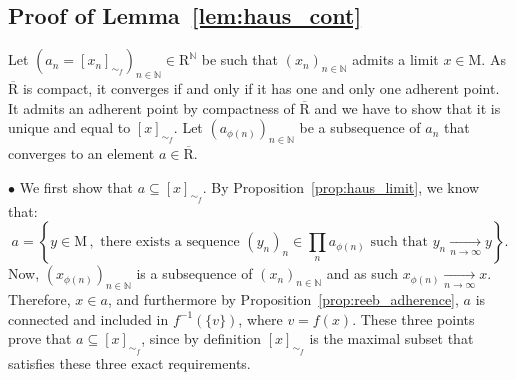 \documentclass[pdflatex,sn-mathphys-ay]{sn-jnl}%
\newcommand{\reeb}{\mathrm{R}}
\newcommand{\man}{\mathrm{M}}
\newcommand{\converge}{\underset{n\rightarrow\infty}{\longrightarrow}}
\newcommand{\N}{\mathbb{N}}
\newcommand{\preim}[2]{#1^{-1}(#2)}
\theoremstyle{thmstyleone}%
\begin{document}
\begin{appendices}
\subsection{Proof of Lemma~\ref{lem:haus_cont}}

Let $(a_n=[x_n]_{\sim_f})_{n\in\N} \in \reeb^{\N}$ be such that $(x_n)_{n\in\N}$ admits a limit $x \in \man$. As $\overline{\reeb}$ is compact, it converges if and only if it has one and only one adherent point. It admits an adherent point by compactness of $\overline{\reeb}$ and we have to show that it is unique and equal to $[x]_{\sim_f}$. Let $(a_{\phi(n)})_{n\in\N}$ be a subsequence of $a_n$ that converges to an element $a\in\overline{\reeb}$. 

$\bullet$ We first show that $a\subseteq[x]_{\sim_f}$. By Proposition~\ref{prop:haus_limit}, we know that:
$$a=\left\{y \in \man \, , \textrm{ there exists a sequence } (y_n)_n  \in \prod_n a_{\phi(n)} 
\textrm{ such that } y_n \converge y \right\}.$$
Now, $(x_{\phi(n)})_{n\in\N}$ is a subsequence of $(x_n)_{n\in\N}$ and as such $x_{\phi(n)}\converge x$. Therefore, $x\in a$, and furthermore by Proposition~\ref{prop:reeb_adherence}, $a$ is connected and included in $\preim{f}{\{v\}}$, where $v=f(x)$. These three points prove that $a\subseteq[x]_{\sim_f}$, since by definition $[x]_{\sim_f}$ is the maximal subset that satisfies these three exact requirements. 


\end{appendices}
\end{document}
